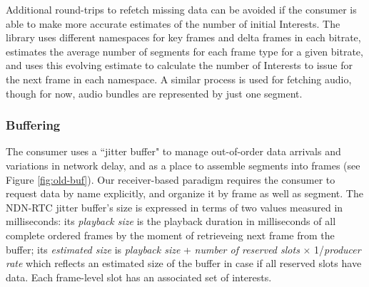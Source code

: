 \documentclass{icn/sig-alternate-2013} %
\newcommand{\ndnrtcName}{NDN-RTC} %
\begin{document}
Additional round-trips to refetch missing data can be avoided if the consumer is able to make more accurate estimates of the number of initial Interests. The library uses different namespaces for key frames and delta frames in each bitrate, estimates the average number of segments for each frame type for a given bitrate, and uses this evolving estimate to calculate the number of Interests to issue for the next frame in each namespace. %
A similar process is used for fetching audio, though for now, audio bundles are represented by just one segment.


\subsubsection{Buffering}


The consumer uses a ``jitter buffer" to manage out-of-order data arrivals and variations in network delay, and as a place to assemble segments into frames (see Figure \ref{fig:old-buf}). %
Our receiver-based paradigm requires the consumer to request data by name explicitly, and organize it by frame as well as segment. %
The \ndnrtcName{} jitter buffer's size is expressed in terms of two values measured in milliseconds: its \textit{playback size} is the playback duration in milliseconds of all complete ordered frames by the moment of retrieveing next frame from the buffer; its \textit{estimated size} is \textit{playback size} + \textit{number of reserved slots} $\times$ 1/\textit{producer rate} which reflects an estimated size of the buffer in case if all reserved slots have data.  Each frame-level slot has an associated set of interests. 
\end{document}
